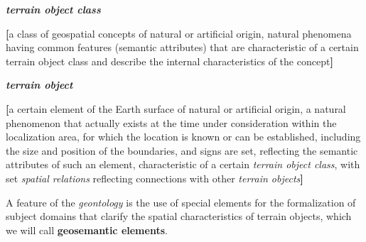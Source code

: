 \documentclass{article}
\begin{document}
\begin{multicols}{2}
    \noindent \textit{\textbf{terrain object class}}
    \vspace{-0.3cm}
    \begin{description}[leftmargin=!, labelwidth=1cm, itemsep=-1mm]
        \item[$\coloneqq$] \textbf{[}a class of geospatial concepts of natural or artificial origin, natural phenomena having common features (semantic attributes) that are characteristic of a certain terrain object class and describe the internal characteristics of the concept\textbf{]}
    \end{description}
    
    \noindent \textit{\textbf{terrain object}}
    \vspace{-0.3cm}
    \begin{description}[leftmargin=!, labelwidth=1cm, itemsep=-1mm]
        \item[$\coloneqq$] \textbf{[}a certain element of the Earth surface of natural or artificial origin, a natural phenomenon that actually exists at the time under consideration within the localization area, for which the location is known or can be established, including the size and position of the boundaries, and signs are set, reflecting the semantic attributes of such an element, characteristic of a certain \textit{terrain object class}, with set \textit{spatial relations} reflecting connections with other \textit{terrain objects}\textbf{]}
    \end{description}

    A feature of the \textit{geontology} is the use of special elements for the formalization of subject domains that clarify the spatial characteristics of terrain objects, which we will call \textbf{geosemantic elements}. \\


\end{multicols}
\end{document}
